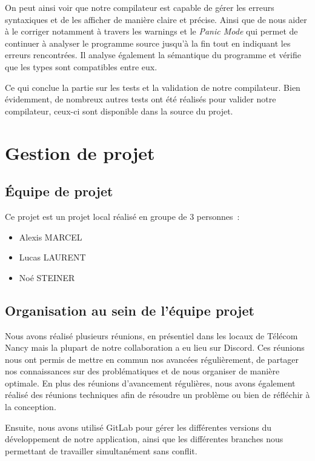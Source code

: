 \documentclass[french,a4paper]{article}
\begin{document}
    On peut ainsi voir que notre compilateur est capable de gérer les erreurs syntaxiques et de les afficher de manière claire et précise.
    Ainsi que de nous aider à le corriger notamment à travers les warnings et le \textit{Panic Mode} qui permet de continuer à analyser le programme source jusqu'à la fin tout en indiquant les erreurs rencontrées.
    Il analyse également la sémantique du programme et vérifie que les types sont compatibles entre eux.
    

    Ce qui conclue la partie sur les tests et la validation de notre compilateur.
    Bien évidemment, de nombreux autres tests ont été réalisés pour valider notre compilateur, ceux-ci sont disponible dans la source du projet.
    \section{Gestion de projet}\label{sec:gestion-de-projet}

    \subsection{Équipe de projet}\label{subsec:equipe-de-projet}
    Ce projet est un projet local réalisé en groupe de 3 personnes~:
    \begin{itemize}
        \item Alexis MARCEL
        \item Lucas LAURENT
        \item Noé STEINER
    \end{itemize}

    \subsection{Organisation au sein de l’équipe projet}\label{subsec:organisation-au-sein-de-lequipe-projet}
    Nous avons réalisé plusieurs réunions, en présentiel dans les locaux de Télécom Nancy mais la plupart de notre collaboration a eu lieu sur Discord.
    Ces réunions nous ont permis de mettre en commun nos avancées régulièrement, de partager nos connaissances sur des problématiques et de nous organiser de manière optimale.
    En plus des réunions d'avancement régulières, nous avons également réalisé des réunions techniques afin de résoudre un problème ou bien de réfléchir à la conception.

    Ensuite, nous avons utilisé GitLab pour gérer les différentes versions du développement de notre application, ainsi que les différentes
    branches nous permettant de travailler simultanément sans conflit.
\end{document}
